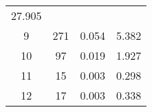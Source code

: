 \documentclass[]{book}
\theoremstyle{definition}
\theoremstyle{definition}
\theoremstyle{definition}
\theoremstyle{remark}
\begin{document}
\begin{longtable}[]{@{}cccc@{}}
\begin{minipage}[t]{0.15\columnwidth}
27.905\strut
\end{minipage}\tabularnewline
\begin{minipage}[t]{0.20\columnwidth}\centering\strut
9\strut
\end{minipage} & \begin{minipage}[t]{0.25\columnwidth}\centering\strut
271\strut
\end{minipage} & \begin{minipage}[t]{0.25\columnwidth}\centering\strut
0.054\strut
\end{minipage} & \begin{minipage}[t]{0.15\columnwidth}\centering\strut
5.382\strut
\end{minipage}\tabularnewline
\begin{minipage}[t]{0.20\columnwidth}\centering\strut
10\strut
\end{minipage} & \begin{minipage}[t]{0.25\columnwidth}\centering\strut
97\strut
\end{minipage} & \begin{minipage}[t]{0.25\columnwidth}\centering\strut
0.019\strut
\end{minipage} & \begin{minipage}[t]{0.15\columnwidth}\centering\strut
1.927\strut
\end{minipage}\tabularnewline
\begin{minipage}[t]{0.20\columnwidth}\centering\strut
11\strut
\end{minipage} & \begin{minipage}[t]{0.25\columnwidth}\centering\strut
15\strut
\end{minipage} & \begin{minipage}[t]{0.25\columnwidth}\centering\strut
0.003\strut
\end{minipage} & \begin{minipage}[t]{0.15\columnwidth}\centering\strut
0.298\strut
\end{minipage}\tabularnewline
\begin{minipage}[t]{0.20\columnwidth}\centering\strut
12\strut
\end{minipage} & \begin{minipage}[t]{0.25\columnwidth}\centering\strut
17\strut
\end{minipage} & \begin{minipage}[t]{0.25\columnwidth}\centering\strut
0.003\strut
\end{minipage} & \begin{minipage}[t]{0.15\columnwidth}\centering\strut
0.338\strut
\end{minipage}\tabularnewline
\bottomrule
\end{longtable}
\end{document}
